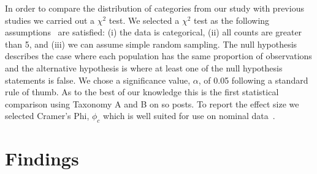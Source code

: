 In order to compare the distribution of categories from our study with previous studies we carried out a \(\chi^2\) test. We selected a \(\chi^2\) test as the following assumptions~\citep{Sheskin:2003tx} are satisfied: (i) the data is categorical, (ii) all counts are greater than 5, and (iii) we can assume simple random sampling. The null hypothesis describes the case where each population has the same proportion of observations and the alternative hypothesis is where at least one of the null hypothesis statements is false. We chose a significance value, \(\alpha\), of 0.05 following a standard rule of thumb. As to the best of our knowledge this is the first statistical comparison using Taxonomy A and B on \gls{so} posts. To report the effect size we selected Cramer's Phi, \(\phi_c\) which is well suited for use on nominal data~\citep{Sheskin:2003tx}.


\section{Findings}
\label{icse2020:sec:findings}

